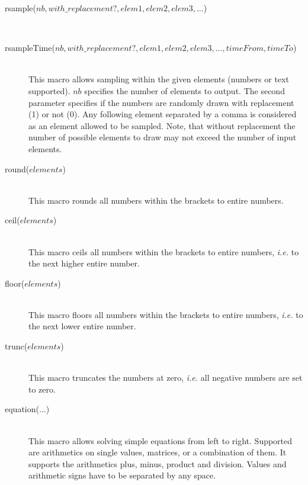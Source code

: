 \documentclass[letterpaper,12pt,oneside]{book}
\begin{document}
\begin{description}
\item[rsample($nb, with\_replacement?, elem1, elem2, elem3, ...$)]\hspace*{\fill}\\
\vspace{-9mm}
\item[rsampleTime($nb, with\_replacement?, elem1, elem2, elem3, ..., timeFrom, timeTo$)]\hspace*{\fill}\\
This macro allows sampling within the given elements (numbers or text supported). $nb$ specifies the number of elements to output. The second parameter specifies if the numbers are randomly drawn with replacement (1) or not (0). Any following element separated by a comma is considered as an element allowed to be sampled. Note, that without replacement the number of possible elements to draw may not exceed the number of input elements.

\item[round($elements$)]\hspace*{\fill}\\
This macro rounds all numbers within the brackets to entire numbers.

\item[ceil($elements$)]\hspace*{\fill}\\
This macro ceils all numbers within the brackets to entire numbers, \textit{i.e.} to the next higher entire number.

\item[floor($elements$)]\hspace*{\fill}\\
This macro floors all numbers within the brackets to entire numbers, \textit{i.e.} to the next lower entire number.

\item[trunc($elements$)]\hspace*{\fill}\\
This macro truncates the numbers at zero, \textit{i.e.} all negative numbers are set to zero.

\item[equation($...$)]\hspace*{\fill}\\
This macro allows solving simple equations from left to right. Supported are arithmetics on single values, matrices, or a combination of them. It supports the arithmetics plus, minus, product and division. Values and arithmetic signs have to be separated by any space.

\end{description}
\end{document}
